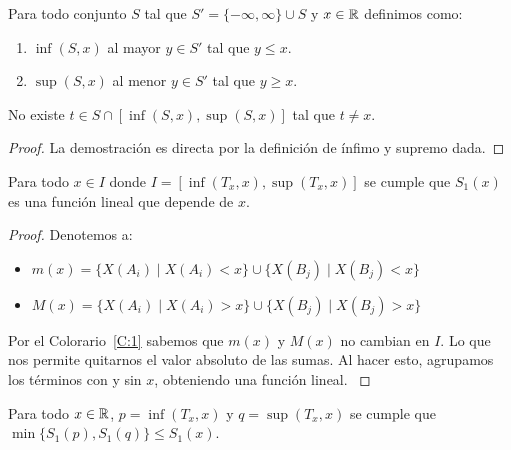\begin{definition}
    Para todo conjunto $S$ tal que $S' = \{ -\infty, \infty \} \cup S$ y $x \in \mathbb{R}$ definimos como:

    \begin{enumerate}
        \item $\inf (S, x)$ al mayor $y \in S'$ tal que $y \le x$.
        \item $\sup (S, x)$ al menor $y \in S'$ tal que $y \ge x$.
    \end{enumerate}
\end{definition}

\begin{collorary}
    No existe $t \in S \cap \left[ \inf(S, x), \sup (S, x) \right]$ tal que $t \neq x$.
    \label{C:1}
\end{collorary}

\begin{proof}
    La demostración es directa por la definición de ínfimo y supremo dada.
\end{proof}

\begin{proposition}
    Para todo $x \in I$ donde $I = \left[\inf(T_x, x), \sup (T_x, x) \right]$ se cumple que $S_1(x)$ es una función lineal que depende de $x$.
    \label{def_fnok}
\end{proposition}

\begin{proof}
    \hfill

    Denotemos a:

    \begin{itemize}[label=\textbullet]
        \item $m(x) = \{ X(A_i) \mid X(A_i) < x \} \cup \{ X(B_j) \mid X(B_j) < x \}$
        \item $M(x) = \{ X(A_i) \mid X(A_i) > x \} \cup \{ X(B_j) \mid X(B_j) > x \}$
    \end{itemize}

    Por el Colorario~\ref{C:1} sabemos que $m(x)$ y $M(x)$ no cambian en $I$. Lo que nos permite quitarnos el valor absoluto de las sumas. Al hacer esto, agrupamos los términos con y sin $x$, obteniendo una función lineal.
    \label{P:linear}
\end{proof}

\begin{proposition}
    Para todo $x \in \mathbb{R}$, $p = \inf(T_x, x)$ y $q = \sup(T_x, x)$ se cumple que $\min \{ S_1(p), S_1(q) \} \le S_1(x)$.
    \label{def_mn}
\end{proposition}

